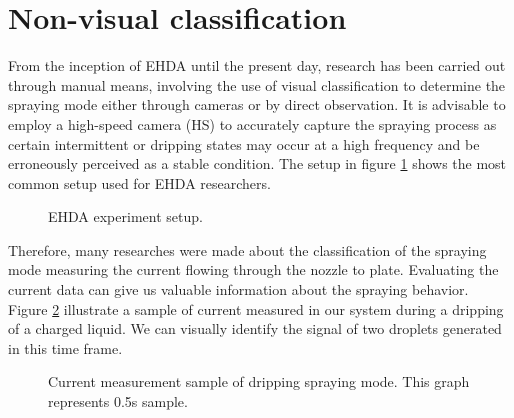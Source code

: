 \section{Non-visual classification}
\label{sec:non-visual-classification}

From the inception of EHDA until the present day, research has been carried out through manual means, involving the use of visual classification to determine the spraying mode either through cameras or by direct observation. It is advisable to employ a high-speed camera (HS) to accurately capture the spraying process as certain intermittent or dripping states may occur at a high frequency and be erroneously perceived as a stable condition.
The setup in figure \ref{fig:ehda_setup} shows the most common setup used for EHDA researchers.

\begin{figure}[H]
  \centering
  \caption{EHDA experiment setup\cite{Luewton}.}
  \label{fig:ehda_setup}
\end{figure}


Therefore, many researches were made about the classification of the spraying mode measuring the current flowing through the nozzle to plate\cite{Sjaaks}\cite{Chen_Pui}. 
Evaluating the current data can give us valuable information about the spraying behavior.
Figure \ref{fig:microdripping_current_pic} illustrate a sample of current measured in our system during a dripping of a charged liquid. 
We can visually identify the signal of two droplets generated in this time frame.


\begin{figure}[H]
    \centering
    \caption{Current measurement sample of dripping spraying mode. This graph represents 0.5s sample.}
    \label{fig:microdripping_current_pic}
  \end{figure}

